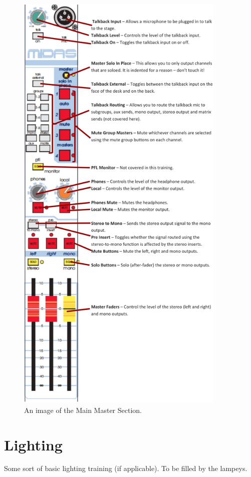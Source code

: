 \documentclass[14pt,twocolumn]{extarticle} %
\begin{document}
\begin{figure}[h]
\begin{center}

\includegraphics[width=10cm]{master-section.jpg}
\caption{An image of the Main Master Section.}
\label{fig:master-section}

\end{center}
\end{figure}


\section{Lighting}
\label{lighting}
Some sort of basic lighting training (if applicable). To be filled by the lampeys.
\end{document}
